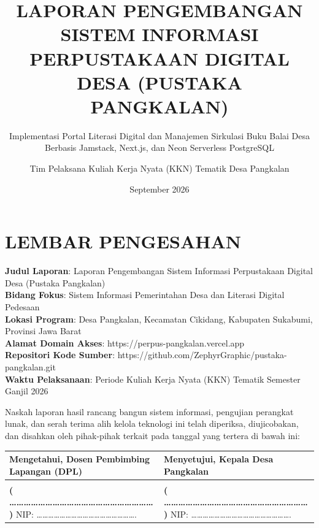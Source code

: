 \documentclass[
  indonesian,
  12pt,
]{report}
\title{LAPORAN PENGEMBANGAN SISTEM INFORMASI PERPUSTAKAAN DIGITAL DESA
(PUSTAKA PANGKALAN)}
\subtitle{Implementasi Portal Literasi Digital dan Manajemen Sirkulasi
Buku Balai Desa Berbasis Jamstack, Next.js, dan Neon Serverless
PostgreSQL}
\author{Tim Pelaksana Kuliah Kerja Nyata (KKN) Tematik Desa Pangkalan}
\date{September 2026}
\newcounter{none} %
\begin{document}
\maketitle

{
\setcounter{tocdepth}{3}
\tableofcontents
}
\newpage

\chapter*{LEMBAR PENGESAHAN}\label{lembar-pengesahan}

\textbf{Judul Laporan}: Laporan Pengembangan Sistem Informasi
Perpustakaan Digital Desa (Pustaka Pangkalan)\\
\textbf{Bidang Fokus}: Sistem Informasi Pemerintahan Desa dan Literasi
Digital Pedesaan\\
\textbf{Lokasi Program}: Desa Pangkalan, Kecamatan Cikidang, Kabupaten
Sukabumi, Provinsi Jawa Barat\\
\textbf{Alamat Domain Akses}: https://perpus-pangkalan.vercel.app\\
\textbf{Repositori Kode Sumber}:
https://github.com/ZephyrGraphic/pustaka-pangkalan.git\\
\textbf{Waktu Pelaksanaan}: Periode Kuliah Kerja Nyata (KKN) Tematik
Semester Ganjil 2026

Naskah laporan hasil rancang bangun sistem informasi, pengujian
perangkat lunak, dan serah terima alih kelola teknologi ini telah
diperiksa, diujicobakan, dan disahkan oleh pihak-pihak terkait pada
tanggal yang tertera di bawah ini:

\vspace{1.2cm}

{\def\LTcaptype{none} %
\begin{longtable}[]{@{}
  >{\centering\arraybackslash}p{}
  >{\centering\arraybackslash}p{}@{}}
\toprule\noalign{}
\begin{minipage}[b]{\linewidth}\centering
Mengetahui, \textbf{Dosen Pembimbing Lapangan (DPL)}
\end{minipage} & \begin{minipage}[b]{\linewidth}\centering
Menyetujui, \textbf{Kepala Desa Pangkalan}
\end{minipage} \\
\midrule\noalign{}
\endhead
\bottomrule\noalign{}
\endlastfoot
\vspace{2.2cm} & \vspace{2.2cm} \\
\textbf{(
\ldots\ldots\ldots\ldots\ldots\ldots\ldots\ldots\ldots\ldots\ldots\ldots\ldots\ldots\ldots\ldots\ldots\ldots\ldots\ldots{}
)} NIP:
\ldots\ldots\ldots\ldots\ldots\ldots\ldots\ldots\ldots\ldots\ldots\ldots\ldots\ldots\ldots\ldots\ldots.
& \textbf{(
\ldots\ldots\ldots\ldots\ldots\ldots\ldots\ldots\ldots\ldots\ldots\ldots\ldots\ldots\ldots\ldots\ldots\ldots\ldots\ldots{}
)} NIP:
\ldots\ldots\ldots\ldots\ldots\ldots\ldots\ldots\ldots\ldots\ldots\ldots\ldots\ldots\ldots\ldots\ldots. \\
\end{longtable}
}
\end{document}
